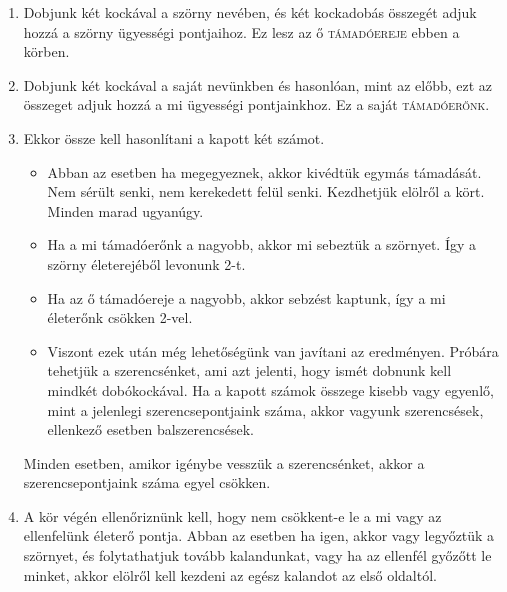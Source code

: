 \documentclass{article}
\begin{document}
        \begin{enumerate}
          \item Dobjunk két kockával a szörny nevében, és két kockadobás összegét adjuk
            hozzá a szörny ügyességi pontjaihoz. Ez lesz az ő \textsc{támadóereje} ebben a körben.
          \item Dobjunk két kockával a saját nevünkben és hasonlóan, mint az előbb,
            ezt az összeget adjuk hozzá a mi ügyességi pontjainkhoz. Ez a saját
            \textsc{támadóerőnk}.
          \item Ekkor össze kell hasonlítani a kapott két számot.
            \begin{itemize}
              \item Abban az esetben ha megegyeznek, akkor kivédtük egymás
                támadását. Nem sérült senki, nem kerekedett felül senki. Kezdhetjük
                elölről a kört. Minden marad ugyanúgy.
              \item Ha a mi támadóerőnk a nagyobb, akkor mi sebeztük a szörnyet. Így a
                szörny életerejéből levonunk 2-t.
              \item Ha az ő támadóereje a nagyobb, akkor sebzést kaptunk, így a mi
                életerőnk csökken 2-vel.
              \item Viszont ezek után még lehetőségünk van javítani az
                eredményen. Próbára tehetjük a szerencsénket, ami azt jelenti, hogy
                ismét dobnunk kell mindkét dobókockával. Ha a kapott számok összege
                kisebb vagy egyenlő, mint a jelenlegi szerencsepontjaink száma,
                akkor vagyunk szerencsések, ellenkező esetben
                balszerencsések.
            \end{itemize}
            Minden esetben, amikor igénybe vesszük a
            szerencsénket, akkor a szerencsepontjaink száma egyel csökken.
          \item A kör végén ellenőriznünk kell, hogy nem csökkent-e le a mi vagy az
            ellenfelünk életerő pontja. Abban az esetben ha igen, akkor vagy
            legyőztük a szörnyet, és folytathatjuk tovább kalandunkat, vagy ha
            az ellenfél győzőtt le minket, akkor elölről kell kezdeni az egész
            kalandot az első oldaltól.
        \end{enumerate} 
\end{document}
